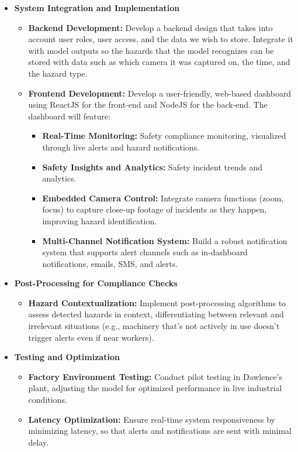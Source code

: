 \documentclass[12pt]{article}
\begin{document}
\begin{itemize}
    \item \textbf{System Integration and Implementation}
    \begin{itemize}
        \item \textbf{Backend Development:} Develop a backend design that takes into account user roles, user access, and the data we wish to store. Integrate it with model outputs so the hazards that the model recognizes can be stored with data such as which camera it was captured on, the time, and the hazard type.
        \item \textbf{Frontend Development:} Develop a user-friendly, web-based dashboard using ReactJS for the front-end and NodeJS for the back-end. The dashboard will feature:
        \begin{itemize}
            \item \textbf{Real-Time Monitoring:} Safety compliance monitoring, visualized through live alerts and hazard notifications.
            \item \textbf{Safety Insights and Analytics:} Safety incident trends and analytics.
            \item \textbf{Embedded Camera Control:} Integrate camera functions (zoom, focus) to capture close-up footage of incidents as they happen, improving hazard identification.
            \item \textbf{Multi-Channel Notification System:} Build a robust notification system that supports alert channels such as in-dashboard notifications, emails, SMS, and alerts.
        \end{itemize}
    \end{itemize}

    \item \textbf{Post-Processing for Compliance Checks}
    \begin{itemize}
        \item \textbf{Hazard Contextualization:} Implement post-processing algorithms to assess detected hazards in context, differentiating between relevant and irrelevant situations (e.g., machinery that’s not actively in use doesn’t trigger alerts even if near workers).
    \end{itemize}

    \item \textbf{Testing and Optimization}
    \begin{itemize}
        \item \textbf{Factory Environment Testing:} Conduct pilot testing in Dawlence’s plant, adjusting the model for optimized performance in live industrial conditions.
        \item \textbf{Latency Optimization:} Ensure real-time system responsiveness by minimizing latency, so that alerts and notifications are sent with minimal delay.
    \end{itemize}


\end{itemize}
\end{document}
